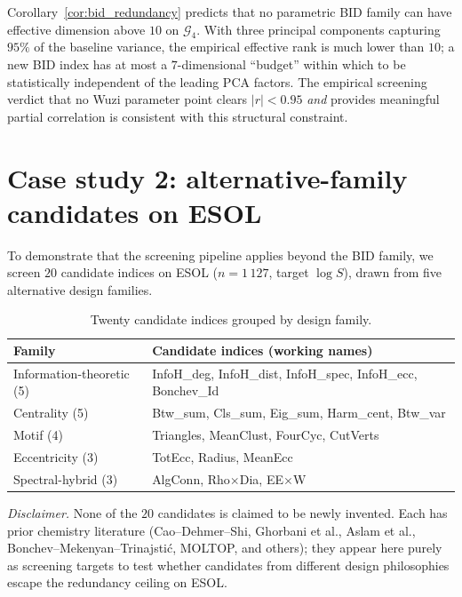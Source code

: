 \documentclass[11pt,a4paper]{article}
\theoremstyle{definition}
\newcommand{\todo}[1]{}
\begin{document}
Corollary~\ref{cor:bid_redundancy} predicts that no parametric BID
family can have effective dimension above $10$ on $\mathcal{G}_4$.
With three principal components capturing $95\%$ of the baseline
variance, the empirical effective rank is much lower than $10$; a
new BID index has at most a $7$-dimensional ``budget''
within which to be statistically independent of the leading PCA
factors. The empirical screening verdict that no Wuzi parameter
point clears $|r|<0.95$ \emph{and} provides meaningful partial
correlation is consistent with this structural constraint.

\section{Case study 2: alternative-family candidates on ESOL}\label{sec:novel_case}

To demonstrate that the screening pipeline applies beyond the BID
family, we screen $20$ candidate indices on ESOL ($n=1\,127$,
target $\log S$), drawn from five alternative design families.

\begin{table}[h]
\centering
\caption{Twenty candidate indices grouped by design family.}
\label{tab:candidates}
\begin{tabular}{ll}
\toprule
Family & Candidate indices (working names)\\
\midrule
Information-theoretic (5) & InfoH\_deg, InfoH\_dist, InfoH\_spec, InfoH\_ecc, Bonchev\_Id\\
Centrality (5) & Btw\_sum, Cls\_sum, Eig\_sum, Harm\_cent, Btw\_var\\
Motif (4) & Triangles, MeanClust, FourCyc, CutVerts\\
Eccentricity (3) & TotEcc, Radius, MeanEcc\\
Spectral-hybrid (3) & AlgConn, Rho$\times$Dia, EE$\times$W\\
\bottomrule
\end{tabular}
\end{table}

\noindent\emph{Disclaimer.} None of the $20$ candidates is claimed
to be newly invented. Each has prior chemistry literature
\todo{[REFERENCES TO BE FILLED FROM literature\_notes.md]} (Cao--Dehmer--Shi,
Ghorbani et al., Aslam et al., Bonchev--Mekenyan--Trinajsti\'c,
MOLTOP, and others); they appear here purely as screening targets
to test whether candidates from different design philosophies
escape the redundancy ceiling on ESOL.
\end{document}
